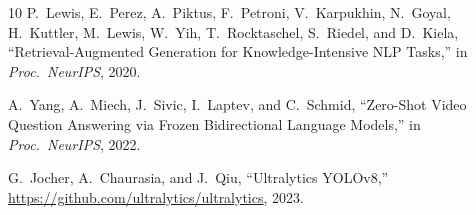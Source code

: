 \documentclass[10pt,conference,compsoc]{IEEEtran}
\begin{document}
\begin{thebibliography}{10}
P.~Lewis, E.~Perez, A.~Piktus, F.~Petroni, V.~Karpukhin,
N.~Goyal, H.~Kuttler, M.~Lewis, W.~Yih, T.~Rocktaschel,
S.~Riedel, and D.~Kiela,
``Retrieval-Augmented Generation for Knowledge-Intensive NLP
Tasks,''
in \textit{Proc.\ NeurIPS}, 2020.

A.~Yang, A.~Miech, J.~Sivic, I.~Laptev, and C.~Schmid,
``Zero-Shot Video Question Answering via Frozen Bidirectional
Language Models,''
in \textit{Proc.\ NeurIPS}, 2022.

G.~Jocher, A.~Chaurasia, and J.~Qiu,
``Ultralytics YOLOv8,''
\url{https://github.com/ultralytics/ultralytics}, 2023.

\end{thebibliography}
\end{document}
